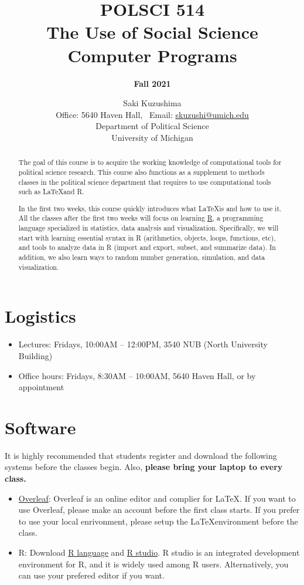 \documentclass[11pt]{article}
\title{\bf POLSCI 514 \\ The Use of Social Science Computer Programs}
\author{\Large {\bf Fall 2021}}
\date{\large Saki Kuzushima \\ \medskip
  Office: 5640 Haven Hall, \ Email: \href{mailto:skuzushi@umich.edu}{skuzushi@umich.edu} \\ \medskip
  Department of Political Science \\ University of Michigan}
\begin{document}
\maketitle

\begin{abstract}
The goal of this course is to acquire the working knowledge of computational tools for political science research.
This course also functions as a supplement to methods classes in the political science department that requires to use computational tools such as \LaTeX and R.

In the first two weeks, this course quickly introduces what \LaTeX is and how to use it. 
All the classes after the first two weeks will focus on learning \href{https://www.r-proect.org/}{R}, a programming language specialized in statistics, data analysis and visualization.
Specifically, we will start with learning essential syntax in R (arithmetics, objects, loops, functions, etc), and tools to analyze data in R (import and export, subset, and summarize data).
In addition, we also learn ways to random number generation, simulation, and data visualization. 
\end{abstract}


\section{Logistics}

\begin{itemize}
\item Lectures: Fridays, 10:00AM -- 12:00PM, 3540 NUB (North University Building) 
\item Office hours: Fridays, 8:30AM -- 10:00AM, 5640 Haven Hall, or by appointment
\end{itemize}


\section{Software}

It is highly recommended that students register and download the following systems before the classes begin.
Also, \textbf{please bring your laptop to every class.}

\begin{itemize}
\item \href{https://www.overleaf.com/}{Overleaf}: Overleaf is an online editor and complier for \LaTeX. 
If you want to use Overleaf, please make an account before the first class starts.
If you prefer to use your local enrivonment, please setup the \LaTeX environment before the class.

\item R: Download \href{https://www.r-project.org/}{R language} and \href{https://www.rstudio.com/}{R studio}. 
R studio is an integrated development environment for R, and it is widely used among R users.
Alternatively, you can use your prefered editor if you want.


\end{itemize} 
\end{document}

